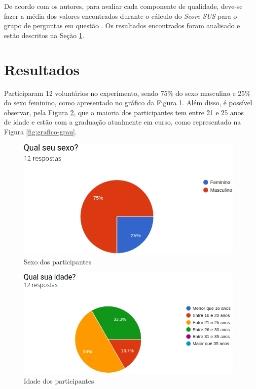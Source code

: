 \par 
De acordo com os autores, para avaliar cada componente de qualidade, deve-se fazer a média dos valores encontrados durante o cálculo do \textit{Score SUS} para o grupo de perguntas 
em questão \cite{nielsen199510}. Os resultados encontrados foram analisado e estão descritos na Seção \ref{sec:resultados}. 

\section{Resultados}
\label{sec:resultados}

Participaram 12 voluntários no experimento, sendo 75\% do sexo masculino e 25\% do sexo feminino, como apresentado no gráfico da Figura \ref{fig:grafico-sexo}. Além disso, 
é possível observar, pela Figura \ref{fig:grafico-idade}, que a maioria dos participantes tem entre 21 e 25 anos de idade e 
estão com a graduação atualmente em curso, como representado na Figura \ref{fig:grafico-grau}.

\begin{figure}[!ht]
    \centering
    \includegraphics[scale=0.4]{./figuras/sexo.png}
    \caption{Sexo dos participantes}
    \label{fig:grafico-sexo}
\end{figure}

\begin{figure}[!ht]
    \centering
    \includegraphics[scale=0.4]{./figuras/idade.png}
    \caption{Idade dos participantes}
    \label{fig:grafico-idade}
\end{figure}

